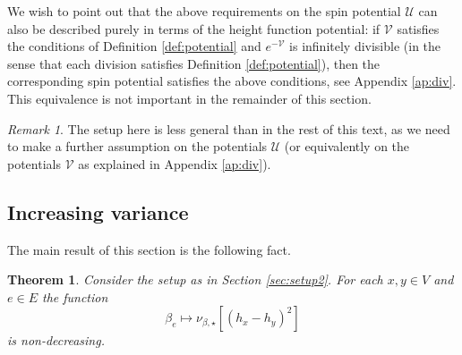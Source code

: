 \documentclass[11pt, reqno]{amsart}
\newtheorem{theorem}{Theorem}[section]
\numberwithin{equation}{section}
\theoremstyle{definition}
\theoremstyle{remark}
\newtheorem{remark}{Remark}
\renewcommand{\c}[1]{\ensuremath{\mathcal{#1}}}
\newcommand{\exact}{\star}
\begin{document}
We wish to point out that the above requirements on the spin potential $\c{U}$ can also be described purely in terms of the height function potential:
if $\c{V}$ satisfies the conditions of Definition \ref{def:potential} and $e^{-\c{V}}$ is infinitely divisible (in the sense that each division satisfies Definition \ref{def:potential}), then the corresponding spin potential satisfies the above conditions, see Appendix \ref{ap:div}. 
This equivalence is not important in the remainder of this section. 

\begin{remark}
		The setup here is less general than in the rest of this text, 
		as we need to make a further assumption on the potentials $\c{U}$ (or equivalently on the potentials $\c{V}$ as explained in Appendix \ref{ap:div}). 
\end{remark}

\subsection{Increasing variance}
The main result of this section is the following fact. 
\begin{theorem} \label{T: var_increasing_height}
	Consider the setup as in Section \ref{sec:setup2}. For each $x, y \in V$ and $e \in E$ the function
	\[
		\beta_e \mapsto \nu_{\beta, \exact}[(h_x - h_y)^2]
	\]
	is non-decreasing. 
\end{theorem}
\end{document}
